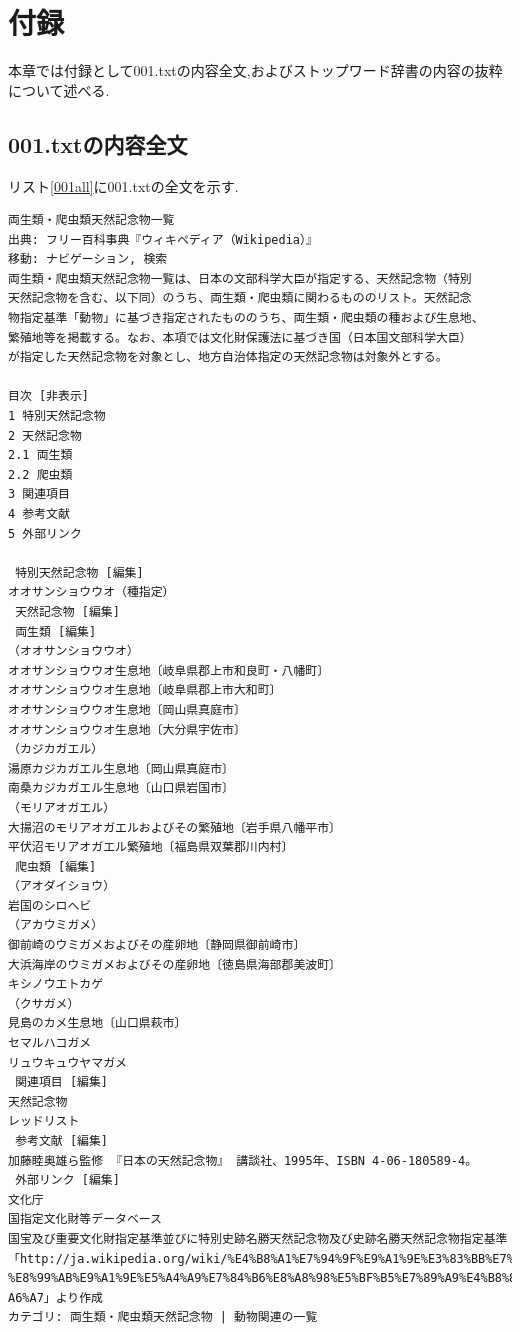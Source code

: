 \documentclass[a4j]{jarticle}
\begin{document}
\section{付録}
本章では付録として001.txtの内容全文,およびストップワード辞書の内容の抜粋について述べる.
\subsection{001.txtの内容全文}
リスト\ref{001all}に001.txtの全文を示す.
\begin{lstlisting}[basicstyle=\ttfamily\footnotesize, frame=single,label=001all,caption=001.txtの全文]
両生類・爬虫類天然記念物一覧
出典: フリー百科事典『ウィキペディア（Wikipedia）』
移動: ナビゲーション, 検索 
両生類・爬虫類天然記念物一覧は、日本の文部科学大臣が指定する、天然記念物（特別
天然記念物を含む、以下同）のうち、両生類・爬虫類に関わるもののリスト。天然記念
物指定基準「動物」に基づき指定されたもののうち、両生類・爬虫類の種および生息地、
繁殖地等を掲載する。なお、本項では文化財保護法に基づき国（日本国文部科学大臣）
が指定した天然記念物を対象とし、地方自治体指定の天然記念物は対象外とする。

目次 [非表示]
1 特別天然記念物
2 天然記念物 
2.1 両生類
2.2 爬虫類
3 関連項目
4 参考文献
5 外部リンク
 
 特別天然記念物 [編集]
オオサンショウウオ（種指定）
 天然記念物 [編集]
 両生類 [編集]
（オオサンショウウオ） 
オオサンショウウオ生息地〔岐阜県郡上市和良町・八幡町〕
オオサンショウウオ生息地〔岐阜県郡上市大和町〕
オオサンショウウオ生息地〔岡山県真庭市〕
オオサンショウウオ生息地〔大分県宇佐市〕
（カジカガエル） 
湯原カジカガエル生息地〔岡山県真庭市〕
南桑カジカガエル生息地〔山口県岩国市〕
（モリアオガエル） 
大揚沼のモリアオガエルおよびその繁殖地〔岩手県八幡平市〕
平伏沼モリアオガエル繁殖地〔福島県双葉郡川内村〕
 爬虫類 [編集]
（アオダイショウ） 
岩国のシロヘビ
（アカウミガメ） 
御前崎のウミガメおよびその産卵地〔静岡県御前崎市〕
大浜海岸のウミガメおよびその産卵地〔徳島県海部郡美波町〕
キシノウエトカゲ
（クサガメ） 
見島のカメ生息地〔山口県萩市〕
セマルハコガメ
リュウキュウヤマガメ
 関連項目 [編集]
天然記念物
レッドリスト
 参考文献 [編集]
加藤睦奥雄ら監修 『日本の天然記念物』 講談社、1995年、ISBN 4-06-180589-4。
 外部リンク [編集]
文化庁 
国指定文化財等データベース
国宝及び重要文化財指定基準並びに特別史跡名勝天然記念物及び史跡名勝天然記念物指定基準
「http://ja.wikipedia.org/wiki/%E4%B8%A1%E7%94%9F%E9%A1%9E%E3%83%BB%E7%88%AC
%E8%99%AB%E9%A1%9E%E5%A4%A9%E7%84%B6%E8%A8%98%E5%BF%B5%E7%89%A9%E4%B8%80%E8%
A6%A7」より作成
カテゴリ: 両生類・爬虫類天然記念物 | 動物関連の一覧
	\end{lstlisting}
\end{document}
